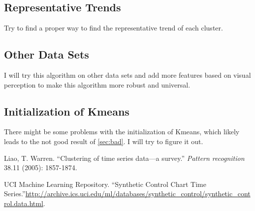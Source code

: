 \documentclass[a4paper]{article}
\begin{document}
\subsection{Representative Trends}
Try to find a proper way to find the representative trend of each cluster. 
\subsection{Other Data Sets}
I will try this algorithm on other data sets and add more features based on visual perception to make this algorithm more robust and universal.
\subsection{Initialization of Kmeans}
There might be some problems with the initialization of Kmeans, which likely leads to the not good result of \ref{sec:bad}. I will try to figure it out.

\begin{thebibliography}{99}
Liao, T. Warren. ``Clustering of time series data—a survey.'' \emph{Pattern recognition} 38.11 (2005): 1857-1874.

UCI Machine Learning Repository. ``Synthetic Control Chart Time Series.''\url{http://archive.ics.uci.edu/ml/databases/synthetic_control/synthetic_control.data.html}.

\end{thebibliography}
\end{document}
